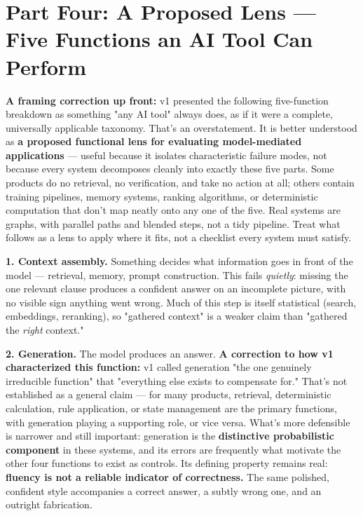 \section{Part Four: A Proposed Lens --- Five Functions an AI Tool Can Perform}

\textbf{A framing correction up front:} v1 presented the following five-function breakdown as something "any AI tool" always does, as if it were a complete, universally applicable taxonomy. That's an overstatement. It is better understood as \textbf{a proposed functional lens for evaluating model-mediated applications} --- useful because it isolates characteristic failure modes, not because every system decomposes cleanly into exactly these five parts. Some products do no retrieval, no verification, and take no action at all; others contain training pipelines, memory systems, ranking algorithms, or deterministic computation that don't map neatly onto any one of the five. Real systems are graphs, with parallel paths and blended steps, not a tidy pipeline. Treat what follows as a lens to apply where it fits, not a checklist every system must satisfy.

\textbf{1. Context assembly.} Something decides what information goes in front of the model --- retrieval, memory, prompt construction. This fails \emph{quietly}: missing the one relevant clause produces a confident answer on an incomplete picture, with no visible sign anything went wrong. Much of this step is itself statistical (search, embeddings, reranking), so "gathered context" is a weaker claim than "gathered the \emph{right} context."

\textbf{2. Generation.} The model produces an answer. \textbf{A correction to how v1 characterized this function:} v1 called generation "the one genuinely irreducible function" that "everything else exists to compensate for." That's not established as a general claim --- for many products, retrieval, deterministic calculation, rule application, or state management are the primary functions, with generation playing a supporting role, or vice versa. What's more defensible is narrower and still important: generation is the \textbf{distinctive probabilistic component} in these systems, and its errors are frequently what motivate the other four functions to exist as controls. Its defining property remains real: \textbf{fluency is not a reliable indicator of correctness.} The same polished, confident style accompanies a correct answer, a subtly wrong one, and an outright fabrication.

